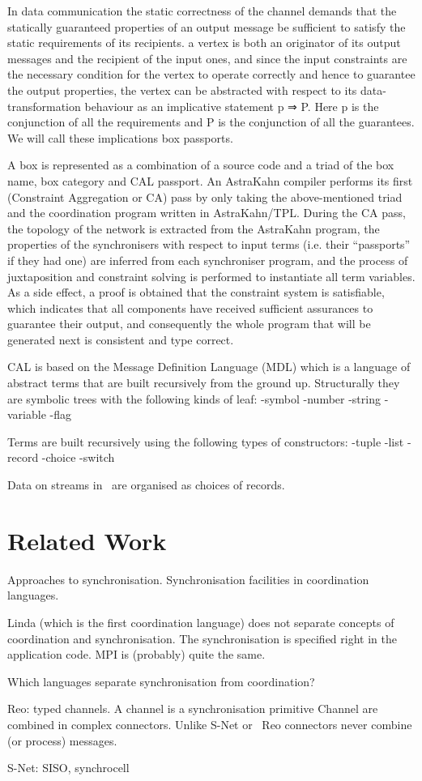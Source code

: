 In data communication the static correctness of the channel demands that the statically guaranteed properties of an output message be sufficient to satisfy the static requirements of its recipients.
a vertex is both an originator of its output messages and the recipient of the input ones, and since the input constraints are the necessary condition for the vertex to operate correctly and hence to guarantee the output properties, the vertex can be abstracted with
respect to its data-transformation behaviour as an implicative statement p ⇒ P. Here p is the conjunction of all the requirements and P is the conjunction of all the guarantees. We will call these implications box passports.

A box is represented as a combination of a source code and a triad of the box name, box category and CAL passport. An AstraKahn compiler performs its first (Constraint Aggregation or CA) pass by only taking the above-mentioned triad and the coordination program written in AstraKahn/TPL. During the CA pass, the topology of the network is extracted from the AstraKahn program, the properties of the synchronisers with respect to input terms (i.e. their “passports” if they had one) are inferred from each synchroniser program, and the process of juxtaposition and constraint solving is performed to instantiate all term variables. As a side effect, a proof is obtained that the constraint system is satisfiable, which indicates that all components have received sufficient assurances to guarantee their output, and consequently the whole program that will be generated next is consistent and type correct.

CAL is based on the Message Definition Language (MDL) which is a language of abstract terms that are built recursively from the ground up. Structurally they are symbolic trees with the following kinds of leaf:
-symbol
-number
-string
-variable
-flag

Terms are built recursively using the following types of constructors:
-tuple
-list
-record
-choice
-switch


Data on streams in \ak\ are organised as choices of records.




\chapter{Related Work}
Approaches to synchronisation.
Synchronisation facilities in coordination languages.

Linda (which is the first coordination language) does not separate concepts of coordination and synchronisation. The synchronisation is specified right in the application code.
MPI is (probably) quite the same.


Which languages separate synchronisation from coordination?

Reo: typed channels. A channel is a synchronisation primitive
Channel are combined in complex connectors.
Unlike S-Net or \ak\ Reo connectors never combine (or process) messages.

S-Net: SISO, synchrocell
